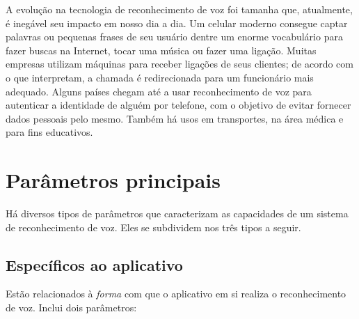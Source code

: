 A evolução na tecnologia de reconhecimento de voz foi tamanha que, atualmente, é inegável seu impacto em nosso dia a dia. Um celular moderno consegue captar palavras ou pequenas frases de seu usuário dentre um enorme vocabulário para fazer buscas na Internet, tocar uma música ou fazer uma ligação. Muitas empresas utilizam máquinas para receber ligações de seus clientes; de acordo com o que interpretam, a chamada é redirecionada para um funcionário mais adequado. Alguns países chegam até a usar reconhecimento de voz para autenticar a identidade de alguém por telefone, com o objetivo de evitar fornecer dados pessoais pelo mesmo. Também há usos em transportes, na área médica e para fins educativos.


\section{Parâmetros principais}

Há diversos tipos de parâmetros que caracterizam as capacidades de um sistema de reconhecimento de voz. Eles se subdividem nos três tipos a seguir.


\subsection{Específicos ao aplicativo}

Estão relacionados à \emph{forma} com que o aplicativo em si realiza o reconhecimento de voz. Inclui dois parâmetros:

